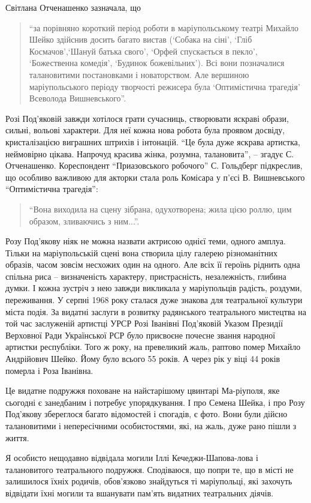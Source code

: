 
Світлана Отченашенко зазначала, що 
\begin{quote}
\enquote{за порівняно короткий період роботи в
маріупольському театрі Михайло Шейко здійснив досить багато вистав (\enquote{Собака на
сіні}, \enquote{Гліб Космачов},\enquote{Шануй батька свого}, \enquote{Орфей спускається в пекло},
\enquote{Божественна комедія}, \enquote{Будинок божевільних}). Всі вони позначалися
талановитими постановками і новаторством. Але вершиною маріупольського періоду
творчості режисера була \enquote{Оптимістична трагедія} Всеволода Вишневського}.
\end{quote}


Розі Под'яковій завжди хотілося грати сучасниць, створювати яскраві образи,
сильні, вольові характери. Для неї кожна нова робота була проявом досвіду,
кристалізацією виграшних штрихів і інтонацій. \enquote{Це була дуже яскрава артистка,
неймовірно цікава. Напрочуд красива жінка, розумна, талановита}, – згадує С.
Отченашенко. Кореспондент \enquote{Приазовського робочого} С. Гольдберг підкреслив, що
особливо важливою для акторки стала роль Комісара у п'єсі В. Вишневського
\enquote{Оптимістична трагедія}: 

\begin{quote}
\enquote{Вона виходила на сцену зібрана, одухотворена; жила
цією роллю, цим образом, зливаючись з ним...}.
\end{quote}

Розу Под'якову ніяк не можна назвати актрисою однієї теми, одного амплуа.
Тільки на маріупольській сцені вона створила цілу галерею різноманітних
образів, часом зовсім несхожих один на одного. Але всіх її героїнь ріднить одна
спільна риса – визначеність характеру, пристрасність, незалежність, глибина
думки. І кожна зустріч з нею завжди викликала у маріупольців радість, роздуми,
переживання. У серпні 1968 року сталася дуже знакова для театральної культури
міста подія. За видатні заслуги в розвитку радянського театрального мистецтва
на той час заслуженій артистці УРСР Розі Іванівні Под'яковій Указом Президії
Верховної Ради Української РСР було присвоєне почесне звання народної артистки
республіки. Того ж року, на превеликий жаль, раптово помер Михайло Андрійович
Шейко. Йому було всього 55 років. А через рік у віці 44 років померла і Роза
Іванівна.

Це видатне подружжя поховане на найстарішому цвинтарі Ма\hyp{}ріуполя, яке сьогодні є
занедбаним і потребує упорядкування. І про Семена Шейка, і про Розу Под'якову
збереглося багато відомостей і спогадів, є фото. Вони були дійсно талановитими
і непересічними особистостями, які, на жаль, дуже рано пішли з життя.

Я особисто нещодавно відвідала могили Іллі Кечеджи-Шапова\hyp{}лова і талановитого
театрального подружжя. Сподіваюся, що попри те, що в місті не залишилося їхніх
родичів, обов'язково знайдуться ті маріупольці, які захочуть відвідати їхні
могили та вшанувати пам'ять видатних театральних діячів.
